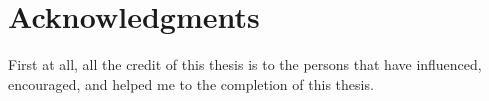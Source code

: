 
\chapter*{Acknowledgments}

First at all, all the credit of this thesis is to the persons that have influenced, encouraged, and helped me to the completion of this thesis. 